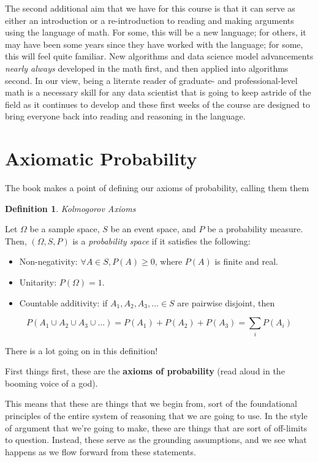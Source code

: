 \documentclass[
]{book}
\providecommand{\tightlist}{%
  \setlength{\itemsep}{0pt}\setlength{\parskip}{0pt}}
\theoremstyle{definition}
\newtheorem{definition}{Definition}[chapter]
\theoremstyle{definition}
\theoremstyle{definition}
\theoremstyle{definition}
\theoremstyle{remark}
\begin{document}
The second additional aim that we have for this course is that it can serve as either an introduction or a re-introduction to reading and making arguments using the language of math. For some, this will be a new language; for others, it may have been some years since they have worked with the language; for some, this will feel quite familiar. New algorithms and data science model advancements \emph{nearly always} developed in the math first, and then applied into algorithms second. In our view, being a literate reader of graduate- and professional-level math is a necessary skill for any data scientist that is going to keep astride of the field as it continues to develop and these first weeks of the course are designed to bring everyone back into reading and reasoning in the language.

\hypertarget{axiomatic-probability}{%
\section{Axiomatic Probability}\label{axiomatic-probability}}

The book makes a point of defining our axioms of probability, calling them them

\begin{definition}
\emph{Kolmogorov Axioms}

Let \(\Omega\) be a sample space, \(S\) be an event space, and \(P\) be a probability measure. Then, \((\Omega, S, P)\) is a \emph{probability space} if it satisfies the following:

\begin{itemize}
\tightlist
\item
  Non-negativity: \(\forall A \in S, P(A) \geq 0\), where \(P(A)\) is finite and real.
\item
  Unitarity: \(P(\Omega)=1\).
\item
  Countable additivity: if \(A_1, A_2, A_3, \dots \in S\) are pairwise disjoint, then
\end{itemize}

\[
P(A_1 \cup A_2 \cup A_3 \cup \dots) = P(A_1) + P(A_2) + P(A_3) = \sum_{i}P(A_{i})
\]
\end{definition}

There is a lot going on in this definition!

First things first, these are the \textbf{axioms of probability} (read aloud in the booming voice of a god).

This means that these are things that we begin from, sort of the foundational principles of the entire system of reasoning that we are going to use. In the style of argument that we're going to make, these are things that are sort of off-limits to question. Instead, these serve as the grounding assumptions, and we see what happens as we flow forward from these statements.
\end{document}

